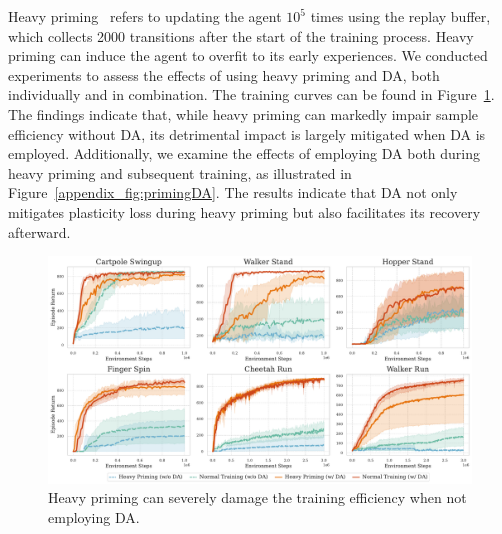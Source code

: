 Heavy priming~\citep{primacy_bias} refers to updating the agent $10^5$ times using the replay buffer, which collects 2000 transitions after the start of the training process. Heavy priming can induce the agent to overfit to its early experiences. We conducted experiments to assess the effects of using heavy priming and DA, both individually and in combination. The training curves can be found in Figure~\ref{appendix_fig:heavy_priming}.
The findings indicate that, while heavy priming can markedly impair sample efficiency without DA, its detrimental impact is largely mitigated when DA is employed. Additionally, we examine the effects of employing DA both during heavy priming and subsequent training, as illustrated in Figure~\ref{appendix_fig:primingDA}. The results indicate that DA not only mitigates plasticity loss during heavy priming but also facilitates its recovery afterward.
\begin{figure}[ht]
  \centering
  \includegraphics[width=\textwidth]{Figures/5Appendix/heavy_priming_vs_normal_training.pdf}
  \vspace{-\baselineskip}
  \caption{Heavy priming can severely damage the training efficiency when not employing DA.}
  \label{appendix_fig:heavy_priming}
\end{figure}

